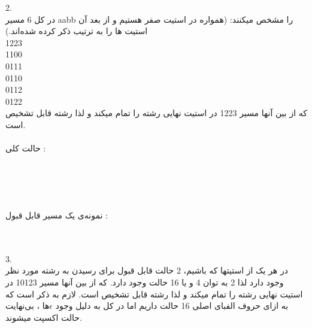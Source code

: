 2.
\\
در کل 6 مسیر aabb را مشخص میکنند:
(همواره در استیت صفر هستیم و از بعد آن استیت ها را به ترتیب ذکر کرده شده‌اند.)
\\
1223
\\
1100
\\
0111
\\
0110
\\
0112
\\
0122\\
که از بین آنها مسیر  1223 در استیت نهایی رشته را تمام میکند و لذا رشته قابل تشخیص است.
\\
\\
حالت کلی :
\\
\begin{center}
\end{center}
\\
\\
\\
\\
نمونه‌ی یک مسیر قابل قبول :
\\
\begin{center}
\end{center}
\\
\\
3.
\\
در هر یک از استیتها که باشیم، 2 حالت قابل قبول برای رسیدن به رشته مورد نظر وجود دارد لذا 2 به توان 4 و یا 16 حالت وجود دارد.
که از بین آنها مسیر 10123 در استیت نهایی رشته را تمام میکند و لذا رشته قابل تشخیص است. لازم به ذکر است که به ازای حروف الفبای اصلی 16 حالت داریم اما در کل به دلیل وجود {{$\epsilon$}}ها ، بی‌نهایت حالت اکسپت میشوند.
